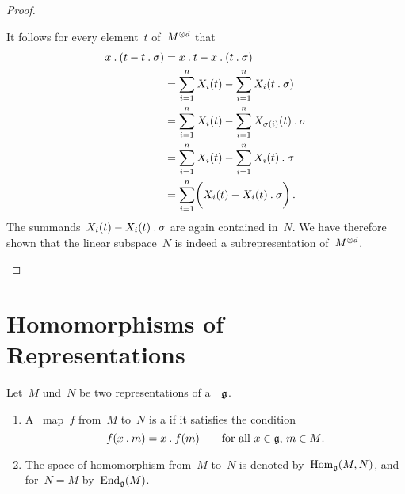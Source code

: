 \begin{proof}
\begin{enumerate}
      
      It follows for every element~$t$ of~$M^{\otimes d}$ that
      \begin{align*}
        x \mathbin{.} ( t - t \mathbin{.} \sigma )
        &=
        x \mathbin{.} t - x \mathbin{.} (t \mathbin{.} \sigma)
        \\
        &=
        \sum_{i=1}^n X_i(t) - \sum_{i=1}^n X_i(t \mathbin{.} \sigma)
        \\
        &=
        \sum_{i=1}^n X_i(t) - \sum_{i=1}^n X_{\sigma(i)}(t) \mathbin{.} \sigma
        \\
        &=
        \sum_{i=1}^n X_i(t) - \sum_{i=1}^n X_i(t) \mathbin{.} \sigma
        \\
        &=
        \sum_{i=1}^n \biggl( X_i(t) - X_i(t) \mathbin{.} \sigma \biggr) \,.
      \end{align*}
      The summands~$X_i(t) - X_i(t) \mathbin{.} \sigma$ are again contained in~$N$.
      We have therefore shown that the linear subspace~$N$ is indeed a subrepresentation of~$M^{\otimes d}$.
    \qedhere
  \end{enumerate}
\end{proof}






\section{Homomorphisms of Representations}


\begin{definition}
  Let~$M$ und~$N$ be two representations of a~{\liealgebra{$\kf$}}~$\mathfrak{g}$.
  \begin{enumerate}
    \item
      A~{\linear{$\kf$}} map~$f$ from~$M$ to~$N$ is a  if it satisfies the condition
      \[
        f(x \mathbin{.} m) = x \mathbin{.} f(m)
        \qquad
        \text{for all~$x \in \mathfrak{g}$,~$m \in M$.}
      \]
    \item
      The space of homomorphism from~$M$ to~$N$ is denoted by~$\operatorname{Hom}_{\mathfrak{g}}(M,N)$, and for~$N = M$ by~$\operatorname{End}_{\mathfrak{g}}(M)$.
  \end{enumerate}
\end{definition}


